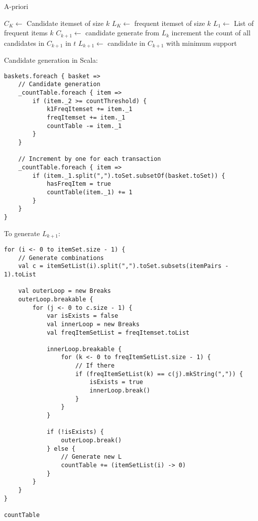 \documentclass[11pt]{article}
\begin{document}
\begin{algorithm}[H]
    \caption{A-priori}

    \begin{algorithmic}[1]
        \State $C_K \gets $ Candidate itemset of size $k$
        \State $L_K \gets $ frequent itemset of size $k$
        \State
        \State $L_1 \gets $ List of frequent items $k$
        \State
            \State $C_{k+1} \gets $ candidate generate from $L_k$
                \State increment the count of all candidates in $C_{k+1}$ in $t$
            \EndFor
            \State $L_{k+1} \gets$ candidate in $C_{k+1}$ with minimum support
        \EndFor
    \end{algorithmic}
\end{algorithm}

Candidate generation in Scala: \\

\begin{lstlisting}
baskets.foreach { basket =>
    // Candidate generation
    _countTable.foreach { item =>
        if (item._2 >= countThreshold) {
            k1FreqItemset += item._1
            freqItemset += item._1
            countTable -= item._1
        }
    }

    // Increment by one for each transaction
    _countTable.foreach { item =>
        if (item._1.split(",").toSet.subsetOf(basket.toSet)) {
            hasFreqItem = true
            countTable(item._1) += 1
        }
    }
}
\end{lstlisting}

To generate $L_{k+1}$: \\

\begin{lstlisting}
for (i <- 0 to itemSet.size - 1) {
    // Generate combinations
    val c = itemSetList(i).split(",").toSet.subsets(itemPairs - 1).toList

    val outerLoop = new Breaks
    outerLoop.breakable {
        for (j <- 0 to c.size - 1) {
            var isExists = false
            val innerLoop = new Breaks
            val freqItemSetList = freqItemset.toList

            innerLoop.breakable {
                for (k <- 0 to freqItemSetList.size - 1) {
                    // If there
                    if (freqItemSetList(k) == c(j).mkString(",")) {
                        isExists = true
                        innerLoop.break()
                    }
                }
            }

            if (!isExists) {
                outerLoop.break()
            } else {
                // Generate new L
                countTable += (itemSetList(i) -> 0)
            }
        }
    }
}

countTable
\end{lstlisting}
\end{document}
